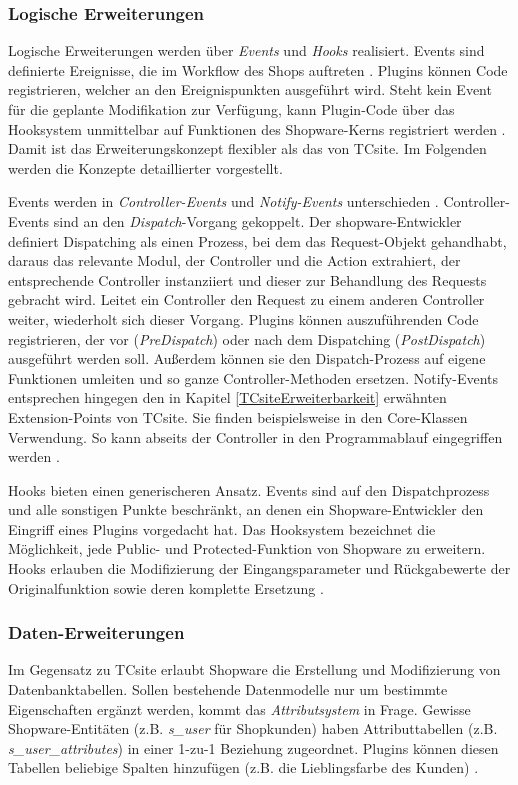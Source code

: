 \documentclass[11pt, a4paper, titlepage, listof=totoc, bibliography=totoc, index=totoc, twoside, openright, headings=normal]{scrreprt}
\begin{document}
\subsubsection*{Logische Erweiterungen}
Logische Erweiterungen werden über \emph{Events} und \emph{Hooks} realisiert. Events sind \glqq definierte Ereignisse, die im Workflow des Shops auftreten\grqq{} \citep{shopware4Docs}. Plugins können Code registrieren, welcher an den Ereignispunkten ausgeführt wird. Steht kein Event für die geplante Modifikation zur Verfügung, kann Plugin-Code über das Hooksystem unmittelbar auf Funktionen des Shopware-Kerns registriert werden \citep{shopware5Docs}. Damit ist das Erweiterungskonzept flexibler als das von TCsite. Im Folgenden werden die Konzepte detaillierter vorgestellt.

Events werden in \emph{Controller-Events} und \emph{Notify-Events} unterschieden \citep{shopware4Docs}. Controller-Events sind an den \emph{Dispatch}-Vorgang gekoppelt. Der shopware-Entwickler \citet{noegel15Diaspatch} definiert Dispatching als einen Prozess, bei dem das Request-Objekt gehandhabt, daraus das relevante Modul, der Controller und die Action extrahiert, der entsprechende Controller instanziiert und dieser zur Behandlung des Requests gebracht wird. Leitet ein Controller den Request zu einem anderen Controller weiter, wiederholt sich dieser Vorgang. Plugins können auszuführenden Code registrieren, der vor (\emph{PreDispatch}) oder nach dem Dispatching (\emph{PostDispatch}) ausgeführt werden soll. Außerdem können sie den Dispatch-Prozess auf eigene Funktionen umleiten und so ganze Controller-Methoden ersetzen. Notify-Events entsprechen hingegen den in Kapitel \ref{TCsiteErweiterbarkeit} erwähnten Extension-Points von TCsite. Sie finden beispielsweise in den Core-Klassen Verwendung. So kann abseits der Controller in den Programmablauf eingegriffen werden \citep{shopware4Docs}.

Hooks bieten einen generischeren Ansatz. Events sind auf den Dispatchprozess und alle sonstigen Punkte beschränkt, an denen ein Shopware-Entwickler den Eingriff eines Plugins vorgedacht hat. Das Hooksystem bezeichnet die Möglichkeit, jede Public- und Protected-Funktion von Shopware zu erweitern. Hooks erlauben die Modifizierung der Eingangsparameter und Rückgabewerte der Originalfunktion sowie deren komplette Ersetzung \citep{noegel15Hooks}.

\subsubsection*{Daten-Erweiterungen}
Im Gegensatz zu TCsite erlaubt Shopware die Erstellung und Modifizierung von Datenbanktabellen. Sollen bestehende Datenmodelle nur um bestimmte Eigenschaften ergänzt werden, kommt das \emph{Attributsystem} in Frage. Gewisse Shopware-Entitäten (z.B. \emph{s\_user} für Shopkunden) haben Attributtabellen (z.B. \emph{s\_user\_attributes}) in einer 1-zu-1 Beziehung zugeordnet. Plugins können diesen Tabellen beliebige Spalten hinzufügen (z.B. die Lieblingsfarbe des Kunden) \citep{shopware5Docs}.
\end{document}
